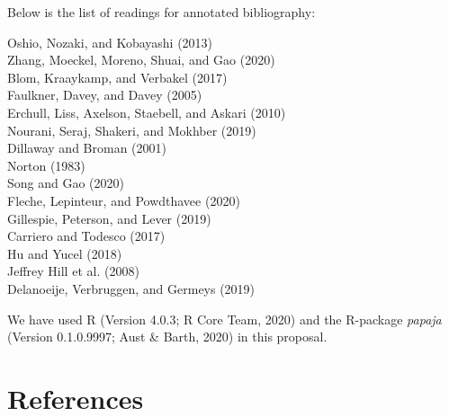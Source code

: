 \documentclass[
  english,
  man]{apa6}
\begin{document}
Below is the list of readings for annotated bibliography:

Oshio, Nozaki, and Kobayashi (2013)\\
Zhang, Moeckel, Moreno, Shuai, and Gao (2020)\\
Blom, Kraaykamp, and Verbakel (2017)\\
Faulkner, Davey, and Davey (2005)\\
Erchull, Liss, Axelson, Staebell, and Askari (2010)\\
Nourani, Seraj, Shakeri, and Mokhber (2019)\\
Dillaway and Broman (2001)\\
Norton (1983)\\
Song and Gao (2020)\\
Fleche, Lepinteur, and Powdthavee (2020)\\
Gillespie, Peterson, and Lever (2019)\\
Carriero and Todesco (2017)\\
Hu and Yucel (2018)\\
Jeffrey Hill et al. (2008)\\
Delanoeije, Verbruggen, and Germeys (2019)

We have used R (Version 4.0.3; R Core Team, 2020) and the R-package \emph{papaja} (Version 0.1.0.9997; Aust \& Barth, 2020) in this proposal.

\newpage

\hypertarget{references}{%
\section{References}\label{references}}

\begingroup
\setlength{\parindent}{-0.5in}
\setlength{\leftskip}{0.5in}
\end{document}
